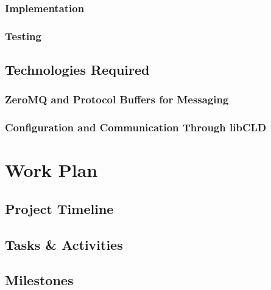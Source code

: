 \documentclass[11pt]{article}
\begin{document}
      \subsubsection{Implementation}
        \label{sec:soln-model-implementation}

      \subsubsection{Testing}
        \label{sec:soln-model-testing}

    \subsection{Technologies Required}
      \label{sec:soln-tech}

      \subsubsection{ZeroMQ and Protocol Buffers for Messaging}
        \label{sec:soln-tech-msg}

      \subsubsection{Configuration and Communication Through libCLD}
        \label{sec:soln-tech-cld}


  \section{Work Plan}
    \label{sec:plan}

    \subsection{Project Timeline}
      \label{sec:plan-time}

    \subsection{Tasks \& Activities}
      \label{sec:plan-tasks}

    \subsection{Milestones}
      \label{sec:plan-milestones}
\end{document}
